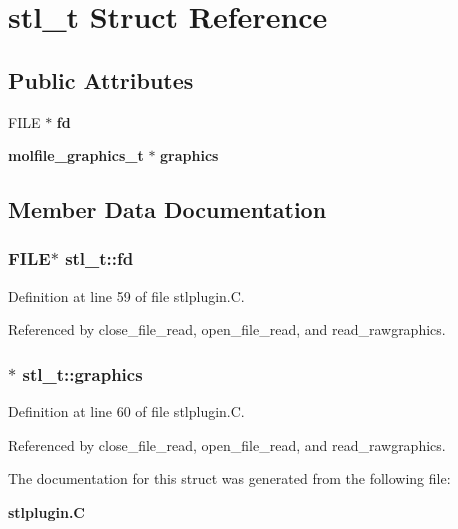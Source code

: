 \section{stl\_\-t  Struct Reference}
\label{structstl__t}
\subsection*{Public Attributes}
\begin{CompactItemize}
\item 
FILE $\ast$ {\bf fd}
\item 
{\bf molfile\_\-graphics\_\-t} $\ast$ {\bf graphics}
\end{CompactItemize}


\subsection{Member Data Documentation}
\subsubsection{\setlength{\rightskip}{0pt plus 5cm}FILE$\ast$ stl\_\-t::fd}\label{structstl__t_m0}




Definition at line 59 of file stlplugin.C.

Referenced by close\_\-file\_\-read, open\_\-file\_\-read, and read\_\-rawgraphics.
\subsubsection{$\ast$ stl\_\-t::graphics}\label{structstl__t_m1}




Definition at line 60 of file stlplugin.C.

Referenced by close\_\-file\_\-read, open\_\-file\_\-read, and read\_\-rawgraphics.

The documentation for this struct was generated from the following file:\begin{CompactItemize}
\item 
{\bf stlplugin.C}\end{CompactItemize}
